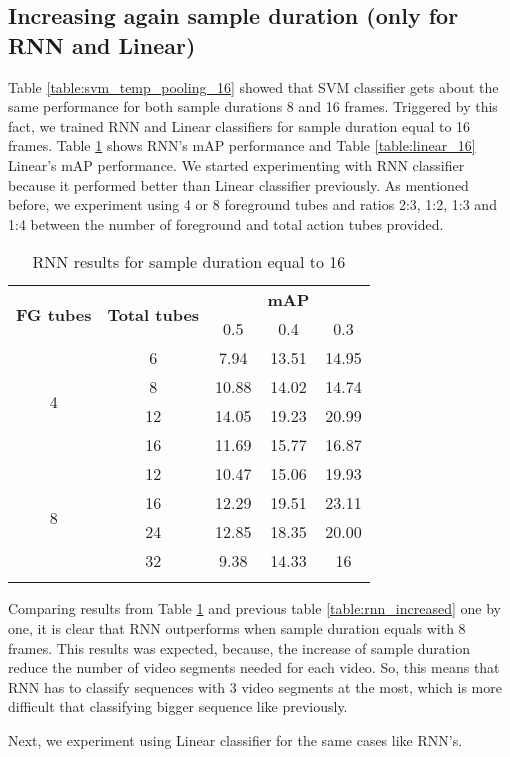 \subsection{Increasing again sample duration (only for RNN and Linear)}

Table \ref{table:svm_temp_pooling_16} showed that SVM classifier gets about the same performance for both sample durations 8 and 16 frames.
Triggered by this fact, we trained RNN and Linear classifiers for sample duration equal to 16 frames. Table \ref{table:rnn_16} shows RNN's mAP
performance and Table \ref{table:linear_16} Linear's mAP performance. We started experimenting with RNN classifier because it performed better than
Linear classifier previously. As mentioned before, we experiment using 4 or 8 foreground tubes and ratios 2:3, 1:2, 1:3 and 1:4 between the number of
foreground and total action tubes provided.

\begin{center}
  \begin{longtable}{|| c | c || c c c ||}
    \hline
    \multirow{2}{*}{\textbf{FG tubes}} & \multirow{2}{*}{\textbf{Total tubes}} & {} & \textbf{mAP} & {} \\
    {} & {} & 0.5 & 0.4 & 0.3 \\
    \hline
    \multirow{4}{*}{4} & 6 & 7.94 & 13.51 & 14.95 \\
    \cline{2-5}
    {} & 8 & 10.88 & 14.02 & 14.74  \\
    \cline{2-5}
    {} & 12 & 14.05 & 19.23 & 20.99 \\
    \cline{2-5}
    {} & 16 & 11.69 & 15.77 & 16.87  \\
    \hline
    \multirow{4}{*}{8} & 12 & 10.47 & 15.06 & 19.93 \\
    \cline{2-5}
    {} & 16 &  12.29 & 19.51 & 23.11  \\
    \cline{2-5}
    {} & 24 & 12.85 & 18.35 & 20.00 \\
    \cline{2-5}
    {} & 32 & 9.38 & 14.33 & 16 \\
    \hline

  \caption{RNN results for sample duration equal to 16}
  \label{table:rnn_16}
\end{longtable}
\end{center}

Comparing results from Table \ref{table:rnn_16} and previous table \ref{table:rnn_increased} one by one, it is clear that RNN outperforms when sample
duration equals with 8 frames. This results was expected, because, the increase of sample duration reduce the number of video segments needed for each video.
So, this means that RNN has to classify sequences with 3 video segments at the most, which is more difficult that classifying bigger sequence like previously. \par
Next, we experiment using Linear classifier for the same cases like RNN's. 

